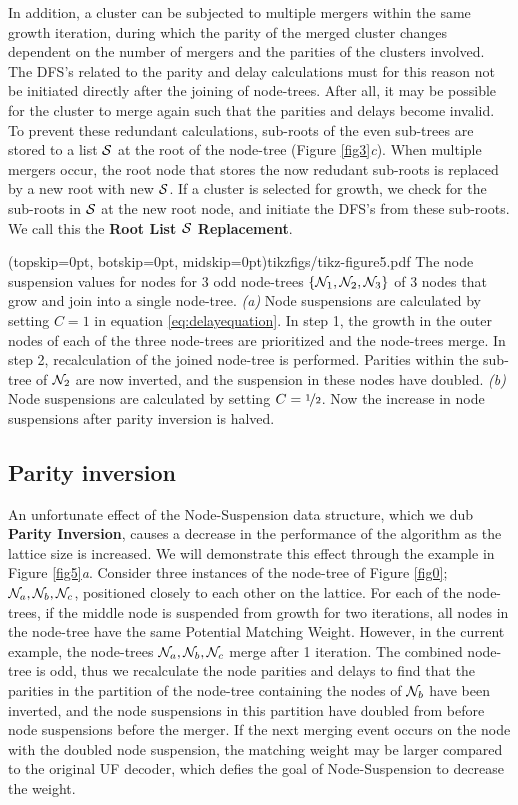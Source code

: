 In addition, a cluster can be subjected to multiple mergers within the same growth iteration, during which the parity of the merged cluster changes dependent on the number of mergers and the parities of the clusters involved. The DFS's related to the parity and delay calculations must for this reason not be initiated directly after the joining of node-trees. After all, it may be possible for the cluster to merge again such that the parities and delays become invalid. To prevent these redundant calculations, sub-roots of the even sub-trees are stored to a list $\mathcal{S}$ at the root of the node-tree (Figure \ref{fig3}\emph{c}). When multiple mergers occur, the root node that stores the now redudant sub-roots is replaced by a new root with new $\mathcal{S}$. If a cluster is selected for growth, we check for the sub-roots in $\mathcal{S}$ at the new root node, and initiate the DFS's from these sub-roots. We call this the \textbf{Root List $\mathcal{S}$ Replacement}. 

\Figure[htb](topskip=0pt, botskip=0pt, midskip=0pt){tikzfigs/tikz-figure5.pdf}{
    The node suspension values for nodes for 3 odd node-trees $\{\mathcal{N}_1, \mathcal{N}_2, \mathcal{N}_3\}$ of 3 nodes that grow and join into a single node-tree. \emph{(a)} Node suspensions are calculated by setting $C=1$ in equation \eqref{eq:delayequation}. In step 1, the growth in the outer nodes of each of the three node-trees are prioritized and the node-trees merge. In step 2, recalculation of the joined node-tree is performed. Parities within the sub-tree of $\mathcal{N}_2$ are now inverted, and the suspension in these nodes have doubled. \emph{(b)} Node suspensions are calculated by setting $C=\nicefrac{1}{2}$. Now the increase in node suspensions after parity inversion is halved.\label{fig5}}

\subsection{Parity inversion}\label{sec:inversion}
An unfortunate effect of the Node-Suspension data structure, which we dub \textbf{Parity Inversion}, causes a decrease in the performance of the algorithm as the lattice size is increased. We will demonstrate this effect through the example in Figure \ref{fig5}\emph{a}. Consider three instances of the node-tree of Figure \ref{fig0}; $\mathcal{N}_a, \mathcal{N}_b, \mathcal{N}_c$, positioned closely to each other on the lattice. For each of the node-trees, if the middle node is suspended from growth for two iterations, all nodes in the node-tree have the same Potential Matching Weight. However, in the current example, the node-trees $\mathcal{N}_a, \mathcal{N}_b, \mathcal{N}_c$ merge after 1 iteration. The combined node-tree is odd, thus we recalculate the node parities and delays to find that the parities in the partition of the node-tree containing the nodes of $\mathcal{N}_b$ have been inverted, and the node suspensions in this partition have doubled from before node suspensions before the merger. If the next merging event occurs on the node with the doubled node suspension, the matching weight may be larger compared to the original UF decoder, which defies the goal of Node-Suspension to decrease the weight.

